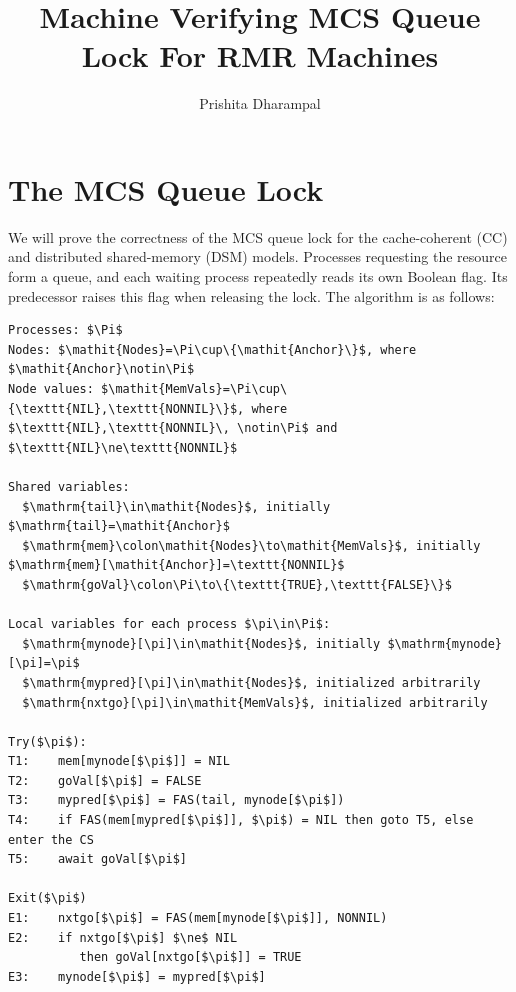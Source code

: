 \documentclass[12pt]{amsproc}
\begin{document}
\title{Machine Verifying MCS Queue Lock For RMR Machines}

\author{Prishita Dharampal}
\date{}
\maketitle
\vspace{-0.3in}

\newcommand{\False}{\texttt{False}}
\newcommand{\True}{\texttt{True}}

\section{The MCS Queue Lock}

We will prove the correctness of the MCS queue lock for the cache-coherent (CC) and distributed shared-memory (DSM) models. Processes requesting the resource form a queue, and each waiting process repeatedly reads its own Boolean flag. Its predecessor raises this flag when releasing the lock. The algorithm is as follows: 

\begin{lstlisting}[mathescape]
Processes: $\Pi$
Nodes: $\mathit{Nodes}=\Pi\cup\{\mathit{Anchor}\}$, where $\mathit{Anchor}\notin\Pi$
Node values: $\mathit{MemVals}=\Pi\cup\{\texttt{NIL},\texttt{NONNIL}\}$, where $\texttt{NIL},\texttt{NONNIL}\, \notin\Pi$ and $\texttt{NIL}\ne\texttt{NONNIL}$

Shared variables:
  $\mathrm{tail}\in\mathit{Nodes}$, initially $\mathrm{tail}=\mathit{Anchor}$
  $\mathrm{mem}\colon\mathit{Nodes}\to\mathit{MemVals}$, initially $\mathrm{mem}[\mathit{Anchor}]=\texttt{NONNIL}$
  $\mathrm{goVal}\colon\Pi\to\{\texttt{TRUE},\texttt{FALSE}\}$

Local variables for each process $\pi\in\Pi$:
  $\mathrm{mynode}[\pi]\in\mathit{Nodes}$, initially $\mathrm{mynode}[\pi]=\pi$
  $\mathrm{mypred}[\pi]\in\mathit{Nodes}$, initialized arbitrarily 
  $\mathrm{nxtgo}[\pi]\in\mathit{MemVals}$, initialized arbitrarily 

Try($\pi$):
T1:    mem[mynode[$\pi$]] = NIL
T2:    goVal[$\pi$] = FALSE
T3:    mypred[$\pi$] = FAS(tail, mynode[$\pi$])
T4:    if FAS(mem[mypred[$\pi$]], $\pi$) = NIL then goto T5, else enter the CS
T5:    await goVal[$\pi$]

Exit($\pi$)
E1:    nxtgo[$\pi$] = FAS(mem[mynode[$\pi$]], NONNIL)
E2:    if nxtgo[$\pi$] $\ne$ NIL
          then goVal[nxtgo[$\pi$]] = TRUE
E3:    mynode[$\pi$] = mypred[$\pi$]
\end{lstlisting}
\end{document}

